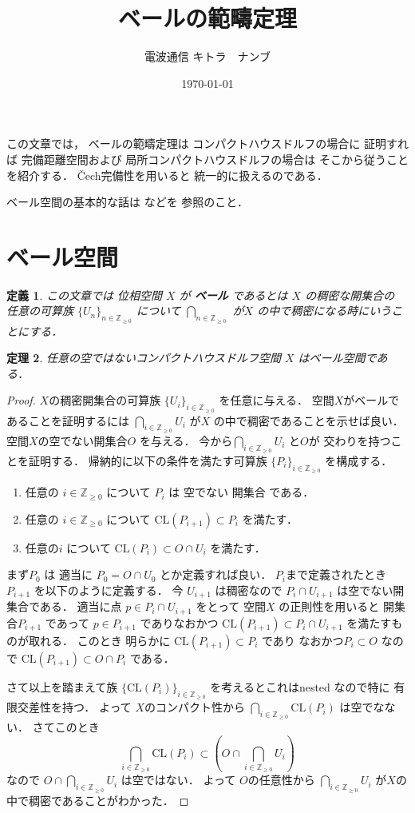 \documentclass[leqno, a4paper, 12pt]{jsarticle}
\title{
ベールの範疇定理
}
\author{電波通信 キトラ　ナンブ}
\date{\today}
\newtheorem{thm}{定理}
\newtheorem{df}[thm]{定義}
\newcommand{\zz}{\mathbb{Z}}
\newcommand{\cl}{\mathrm{CL}}
\begin{document}
\maketitle

この文章では，
ベールの範疇定理は
コンパクトハウスドルフの場合に
証明すれば
完備距離空間および
局所コンパクトハウスドルフの場合は
そこから従うことを紹介する．
\v{C}ech完備性を用いると
統一的に扱えるのである．

ベール空間の基本的な話は
\cite{Den1}
などを
参照のこと．

\section{ベール空間}

\begin{df}
この文章では
位相空間
$X$
が
\textbf{ベール}
であるとは
$X$
の稠密な開集合の
任意の可算族
$\{U_{n}\}_{n\in \zz_{\ge 0}}$
について
$\bigcap_{n\in \zz_{\ge 0}}$
が$X$
の中で稠密になる時にいうことにする．
\end{df}


\begin{thm}\label{thm:cptbaire}
任意の空ではないコンパクトハウスドルフ空間
$X$
はベール空間である．
\end{thm}
\begin{proof}
$X$の稠密開集合の可算族
$\{U_{i}\}_{i\in \zz_{\ge 0}}$
を任意に与える．
空間$X$がベールであることを証明するには
$\bigcap_{i\in \zz_{\ge 0}}U_{i}$
が$X$
の中で稠密であることを示せば良い．
空間$X$の空でない開集合$O$
を与える．
今から$\bigcap_{i\in \zz_{\ge 0}}U_{i}$
と$O$が
交わりを持つことを証明する．
帰納的に以下の条件を満たす可算族
$\{P_{i}\}_{i\in \zz_{\ge 0}}$
を構成する．
\begin{enumerate}[label=\textup{(\arabic*)}]
\item 
任意の
$i\in \zz_{\ge 0}$
について
$P_{i}$
は
空でない
開集合
である．
\item 
任意の
$i\in \zz_{\ge 0}$
について
$\cl(P_{i+1})\subset P_{i}$
を満たす．
\item 
任意の$i$
について
$\cl(P_{i})\subset O\cap U_{i}$
を満たす．
\end{enumerate}
まず$P_{0}$
は
適当に
$P_{0}=O\cap U_{0}$
とか定義すれば良い．
$P_{i}$まで定義されたとき$P_{i+1}$
を以下のように定義する．
今
$U_{i+1}$
は稠密なので
$P_{i}\cap U_{i+1}$
は空でない開集合である．
適当に点
$p\in P_{i}\cap U_{i+1}$
をとって
空間$X$
の正則性を用いると
開集合$P_{i+1}$
であって
$p\in P_{i+1}$
でありなおかつ
$\cl(P_{i+1})\subset P_{i}\cap U_{i+1}$
を満たすものが取れる．
このとき
明らかに
$\cl(P_{i+1})\subset P_{i}$
であり
なおかつ$P_{i}\subset O$
なので
$\cl(P_{i+1})\subset O\cap P_{i}$
である．

さて以上を踏まえて族
$\{\cl(P_{i})\}_{i\in \zz_{\ge 0}}$
を考えるとこれはnested
なので特に
有限交差性を持つ．
よって
$X$のコンパクト性から
$\bigcap_{i\in \zz_{\ge 0}}\cl(P_{i})$
は空でなない．
さてこのとき
\[
\bigcap_{i\in \zz_{\ge 0}}\cl(P_{i})\subset
\left( O\cap \bigcap_{i\in \zz_{\ge 0}}U_{i}\right)
\]
なので
$O\cap \bigcap_{i\in \zz_{\ge 0}}U_{i}$
は空ではない．
よって
$O$の任意性から
$\bigcap_{i\in \zz_{\ge 0}}U_{i}$
が$X$の中で稠密であることがわかった．
\end{proof}
\end{document}
